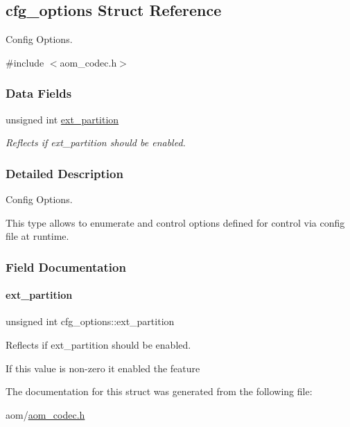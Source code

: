 \hypertarget{structcfg__options}{}\subsection{cfg\+\_\+options Struct Reference}
\label{structcfg__options}


Config Options.  




{\ttfamily \#include $<$aom\+\_\+codec.\+h$>$}

\subsubsection*{Data Fields}
\begin{DoxyCompactItemize}
\item 
unsigned int \hyperlink{structcfg__options_a182a68d20ce40143d34cfbc385c353b6}{ext\+\_\+partition}
\begin{DoxyCompactList}\small\item\em Reflects if ext\+\_\+partition should be enabled. \end{DoxyCompactList}\end{DoxyCompactItemize}


\subsubsection{Detailed Description}
Config Options. 

This type allows to enumerate and control options defined for control via config file at runtime. 

\subsubsection{Field Documentation}
\mbox{\label{structcfg__options_a182a68d20ce40143d34cfbc385c353b6}} 
\paragraph{\texorpdfstring{ext\+\_\+partition}{ext\_partition}}
{\footnotesize\ttfamily unsigned int cfg\+\_\+options\+::ext\+\_\+partition}



Reflects if ext\+\_\+partition should be enabled. 

If this value is non-\/zero it enabled the feature 

The documentation for this struct was generated from the following file\+:\begin{DoxyCompactItemize}
\item 
aom/\hyperlink{aom__codec_8h}{aom\+\_\+codec.\+h}\end{DoxyCompactItemize}
